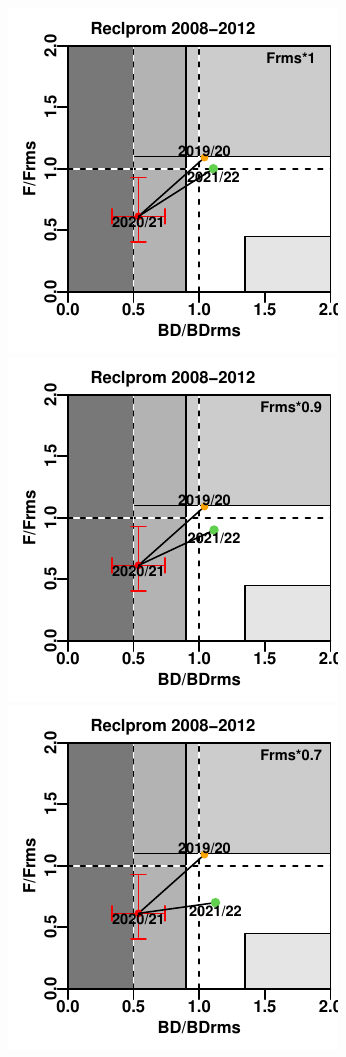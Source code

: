 \documentclass[
  spanish,
]{article}
\begin{document}
\includegraphics{FigurasInforme_Marzo/Fig45b_marzo-1.pdf}
\includegraphics{FigurasInforme_Marzo/Fig45b_marzo-2.pdf}
\includegraphics{FigurasInforme_Marzo/Fig45b_marzo-3.pdf}
\end{document}
